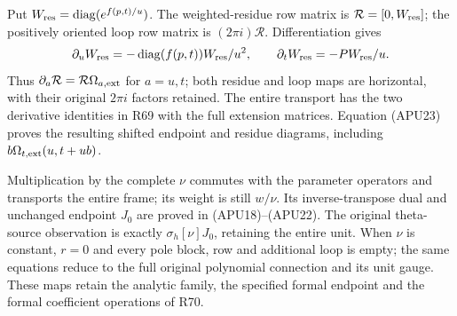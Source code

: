 Put \(W_{\rm res}=\operatorname{diag}(e^{f(p,t)/u})\).
The weighted-residue row matrix is \(\mathcal R=[0,W_{\rm res}]\);
the positively oriented loop row matrix is \((2\pi i)\mathcal R\).
Differentiation gives
\[
 \partial_u W_{\rm res}
    =-\operatorname{diag}(f(p,t))W_{\rm res}/u^2,\qquad
 \partial_t W_{\rm res}=-PW_{\rm res}/u.
\]
Thus \(\partial_a\mathcal R=\mathcal R\Omega_{a,\rm ext}\)
for \(a=u,t\); both residue and loop maps are horizontal, with
their original \(2\pi i\) factors retained. The entire transport
has the two derivative identities in R69 with the full extension
matrices. Equation (APU23) proves the resulting shifted endpoint
and residue diagrams, including
\(b\Omega_{t,\rm ext}(u,t+ub)\).

Multiplication by the complete \(\nu\) commutes with the
parameter operators and transports the entire frame; its weight
is still \(w/\nu\). Its inverse-transpose dual and unchanged
endpoint \(J_0\) are proved in (APU18)--(APU22).
The original theta-source observation is exactly
\(\sigma_h[\nu]J_0\), retaining the entire unit.
When \(\nu\) is constant, \(r=0\) and every pole block, row
and additional loop is empty; the same equations reduce to the
full original polynomial connection and its unit gauge.
These maps retain the analytic family, the specified formal
endpoint and the formal coefficient operations of R70.

